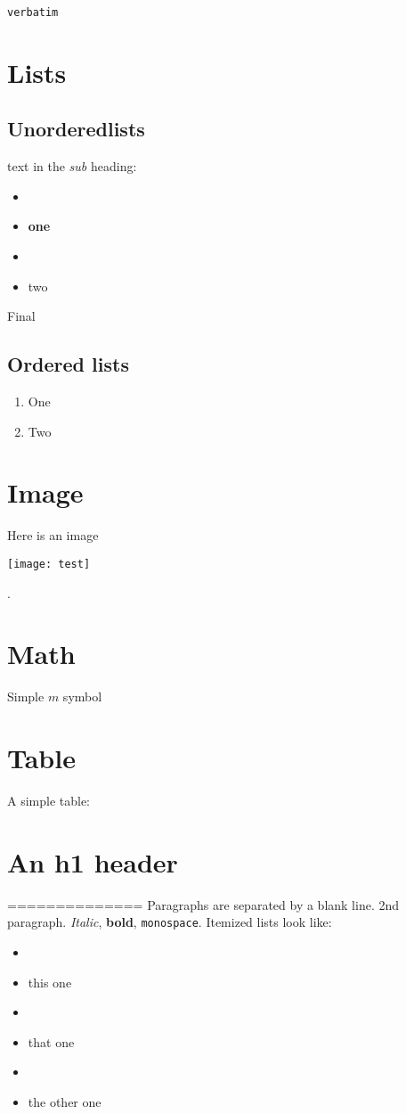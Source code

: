 \begin{verbatim}
verbatim
\end{verbatim}
\section{Lists}
\subsection{Unorderedlists}
text in the \emph{sub} heading:

\begin{itemize}
\item \item \textbf{one}

\item \item two

\end{itemize}

Final
\subsection{Ordered lists}

\begin{enumerate}
\item One
\item Two
\end{enumerate}

\section{Image}
Here is an image 
\begin{center}
\texttt{[image: test]}
\end{center}
.
\section{Math}
Simple $m$ symbol
\section{Table}
A simple table:
\section{An h1 header}
==============
Paragraphs are separated by a blank line.
2nd paragraph. \emph{Italic}, \textbf{bold}, \lstinline!monospace!. Itemized lists
look like:

\begin{itemize}
\item \item this one

\item \item that one

\item \item the other one

\end{itemize}

